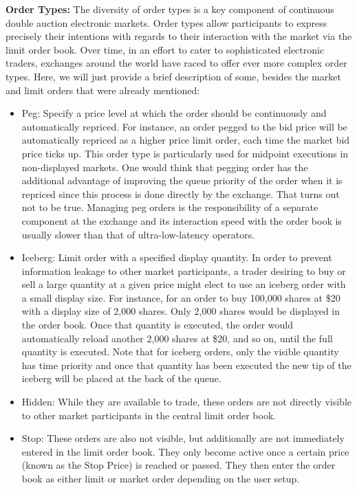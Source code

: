 \noindent\textbf{Order Types:} The diversity of order types is a key component of continuous double auction electronic markets. Order types allow participants to express precisely their intentions with regards to their interaction with the market via the limit order book. Over time, in an effort to cater to sophisticated electronic traders, exchanges around the world have raced to offer ever more complex order types. Here, we will just provide a brief description of some, besides the market and limit orders that were already mentioned:

\begin{itemize}
\item Peg: Specify a price level at which the order should be continuously and automatically repriced. For instance, an order pegged to the bid price will be automatically repriced as a higher price limit order, each time the market bid price ticks up. This order type is particularly used for midpoint executions in non-displayed markets. One would think that pegging order has the additional advantage of improving the queue priority of the order when it is repriced since this process is done directly by the exchange. That turns out not to be true. Managing peg orders is the responsibility of a separate component at the exchange and its interaction speed with the order book is usually slower than that of ultra-low-latency operators.

\item Iceberg: Limit order with a specified display quantity. In order to prevent information leakage to other market participants, a trader desiring to buy or sell a large quantity at a given price might elect to use an iceberg order with a small display size. For instance, for an order to buy 100,000 shares at \$20 with a display size of 2,000 shares. Only 2,000 shares would be displayed in the order book. Once that quantity is executed, the order would automatically reload another 2,000 shares at \$20, and so on, until the full quantity is executed. Note that for iceberg orders, only the visible quantity has time priority and once that quantity has been executed the new tip of the iceberg will be placed at the back of the queue.

\item Hidden: While they are available to trade, these orders are not directly visible to other market participants in the central limit order book. 

\item Stop: These orders are also not visible, but additionally are not immediately entered in the limit order book. They only become active once a certain price (known as the Stop Price) is reached or passed. They then enter the order book as either limit or market order depending on the user setup.


\end{itemize}
